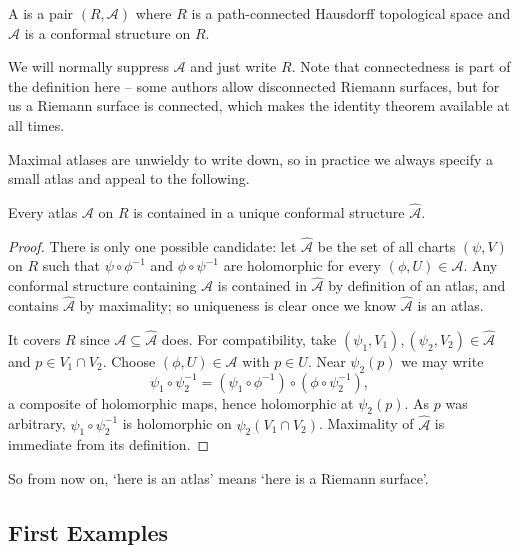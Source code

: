 \documentclass[a4paper]{scrartcl}
\begin{document}
\begin{definition}
	A  is a pair $(R, \mathcal{A})$ where $R$ is a path-connected
	Hausdorff topological space and $\mathcal{A}$ is a conformal structure on $R$.
\end{definition}

We will normally suppress $\mathcal{A}$ and just write $R$. Note that connectedness is
part of the definition here -- some authors allow disconnected Riemann surfaces, but for
us a Riemann surface is connected, which makes the identity theorem available at all
times.

Maximal atlases are unwieldy to write down, so in practice we always specify a small
atlas and appeal to the following.

\begin{lemma}\label{lem:atlasextends}
	Every atlas $\mathcal{A}$ on $R$ is contained in a unique conformal structure
	$\hat{\mathcal{A}}$.
\end{lemma}

\begin{proof}
	There is only one possible candidate: let $\hat{\mathcal{A}}$ be the set of all charts
	$(\psi, V)$ on $R$ such that $\psi \circ \phi^{-1}$ and $\phi \circ \psi^{-1}$ are
	holomorphic for every $(\phi, U) \in \mathcal{A}$. Any conformal structure containing
	$\mathcal{A}$ is contained in $\hat{\mathcal{A}}$ by definition of an atlas, and
	contains $\hat{\mathcal{A}}$ by maximality; so uniqueness is clear once we know
	$\hat{\mathcal{A}}$ is an atlas.

	It covers $R$ since $\mathcal{A} \subseteq \hat{\mathcal{A}}$ does. For compatibility,
	take $(\psi_1, V_1), (\psi_2, V_2) \in \hat{\mathcal{A}}$ and $p \in V_1 \cap V_2$.
	Choose $(\phi, U) \in \mathcal{A}$ with $p \in U$. Near $\psi_2(p)$ we may write
	$$
	\psi_1 \circ \psi_2^{-1} = (\psi_1 \circ \phi^{-1}) \circ (\phi \circ \psi_2^{-1}),
	$$
	a composite of holomorphic maps, hence holomorphic at $\psi_2(p)$. As $p$ was
	arbitrary, $\psi_1 \circ \psi_2^{-1}$ is holomorphic on $\psi_2(V_1 \cap V_2)$.
	Maximality of $\hat{\mathcal{A}}$ is immediate from its definition.
\end{proof}

So from now on, `here is an atlas' means `here is a Riemann surface'.

\subsection{First Examples}
\end{document}
